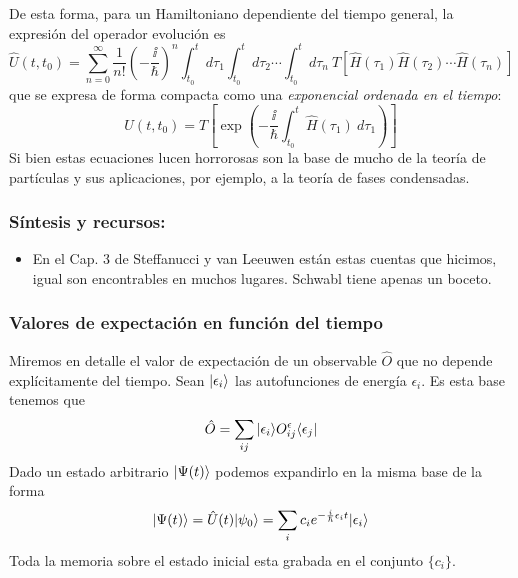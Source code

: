 \documentclass{beamer}
\begin{document}
\begin{frame}
    De esta forma, para un Hamiltoniano dependiente del tiempo general, la expresión del operador evolución es
    \begin{equation*}
    \hat{U}(t,t_0)=\sum_{n=0}^\infty
    \frac{1}{n!}
    \left(-\frac{\ii}{\hbar}\right)^n
    \int_{t_0}^{t}d\tau_{1}\int_{t_0}^{t}d\tau_2\cdots\int_{t_0}^{t}d\tau_n\ 
    T[\hat{H}(\tau_1)\hat{H}(\tau_2)\cdots\hat{H}(\tau_n)]
    \end{equation*}
    que se expresa de forma compacta como una {\em exponencial ordenada en el tiempo}:
    \begin{equation*}
    U(t,t_0)= T\left[\exp\left(-\frac{\ii}{\hbar}\int_{t_0}^t\hat{H}(\tau_1)\ d\tau_1\right)\right]
    \end{equation*}
    Si bien estas ecuaciones lucen horrorosas son la base de mucho de la teoría de partículas y sus aplicaciones, por ejemplo, a la teoría de fases condensadas.
\end{frame}

\begin{frame}
    \frametitle{Síntesis y recursos:}
    
    \begin{itemize}
    \item En el Cap. 3 de Steffanucci y van Leeuwen están estas cuentas que hicimos, igual son encontrables en muchos lugares. Schwabl tiene apenas un boceto.
    \end{itemize}
    \end{frame}


\begin{frame}
    \frametitle{Valores de expectación en función del tiempo}

    Miremos en detalle el valor de expectación de un observable $\hat{O}$ que no depende explícitamente del tiempo. Sean $| \epsilon_i \rangle$ las autofunciones de energía $\epsilon_i$. Es esta base tenemos que
    $$\hat{O}=\sum_{ij}| \epsilon_i \rangle O^\epsilon_{ij}\langle \epsilon_j |$$
    Dado un estado arbitrario $| \Psi(t) \rangle$ podemos expandirlo en la misma base de la forma
    $$| \Psi(t) \rangle=\hat{U}(t)| \psi_0 \rangle=\sum_i c_i e^{-\frac{i}{\hbar}\epsilon_i t} | \epsilon_i \rangle$$
    Toda la memoria sobre el estado inicial esta grabada en el conjunto $\{ c_i\}$. 
\end{frame}
\end{document}
